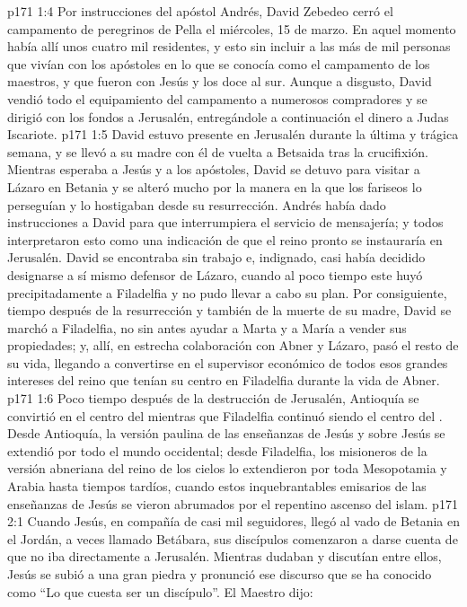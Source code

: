 \vs p171 1:4 Por instrucciones del apóstol Andrés, David Zebedeo cerró el campamento de peregrinos de Pella el miércoles, 15 de marzo. En aquel momento había allí unos cuatro mil residentes, y esto sin incluir a las más de mil personas que vivían con los apóstoles en lo que se conocía como el campamento de los maestros, y que fueron con Jesús y los doce al sur. Aunque a disgusto, David vendió todo el equipamiento del campamento a numerosos compradores y se dirigió con los fondos a Jerusalén, entregándole a continuación el dinero a Judas Iscariote.
\vs p171 1:5 \pc David estuvo presente en Jerusalén durante la última y trágica semana, y se llevó a su madre con él de vuelta a Betsaida tras la crucifixión. Mientras esperaba a Jesús y a los apóstoles, David se detuvo para visitar a Lázaro en Betania y se alteró mucho por la manera en la que los fariseos lo perseguían y lo hostigaban desde su resurrección. Andrés había dado instrucciones a David para que interrumpiera el servicio de mensajería; y todos interpretaron esto como una indicación de que el reino pronto se instauraría en Jerusalén. David se encontraba sin trabajo e, indignado, casi había decidido designarse a sí mismo defensor de Lázaro, cuando al poco tiempo este huyó precipitadamente a Filadelfia y no pudo llevar a cabo su plan. Por consiguiente, tiempo después de la resurrección y también de la muerte de su madre, David se marchó a Filadelfia, no sin antes ayudar a Marta y a María a vender sus propiedades; y, allí, en estrecha colaboración con Abner y Lázaro, pasó el resto de su vida, llegando a convertirse en el supervisor económico de todos esos grandes intereses del reino que tenían su centro en Filadelfia durante la vida de Abner.
\vs p171 1:6 Poco tiempo después de la destrucción de Jerusalén, Antioquía se convirtió en el centro del  mientras que Filadelfia continuó siendo el centro del . Desde Antioquía, la versión paulina de las enseñanzas de Jesús y sobre Jesús se extendió por todo el mundo occidental; desde Filadelfia, los misioneros de la versión abneriana del reino de los cielos lo extendieron por toda Mesopotamia y Arabia hasta tiempos tardíos, cuando estos inquebrantables emisarios de las enseñanzas de Jesús se vieron abrumados por el repentino ascenso del islam.
\vs p171 2:1 Cuando Jesús, en compañía de casi mil seguidores, llegó al vado de Betania en el Jordán, a veces llamado Betábara, sus discípulos comenzaron a darse cuenta de que no iba directamente a Jerusalén. Mientras dudaban y discutían entre ellos, Jesús se subió a una gran piedra y pronunció ese discurso que se ha conocido como “Lo que cuesta ser un discípulo”. El Maestro dijo:
